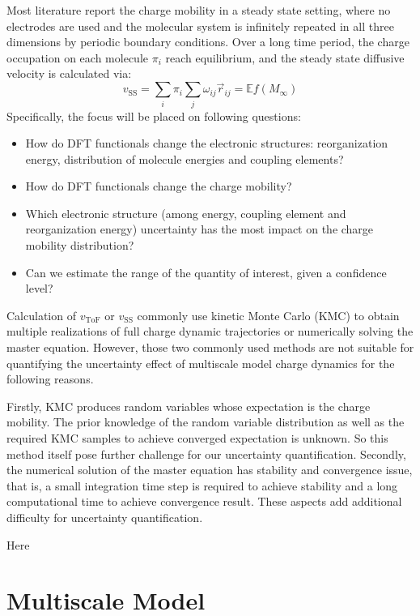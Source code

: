 \documentclass[letterpaper,12pt]{article}
\begin{document}
Most literature report the charge mobility in a steady state setting, where no electrodes are used and the molecular system is infinitely repeated in all three dimensions by periodic boundary conditions. 
Over a long time period, the charge occupation on each molecule $\pi_i$ reach equilibrium, and the steady state diffusive velocity is calculated via:
\begin{equation}
    v_\text{SS} = \sum_i \pi_i \sum_j \omega_{ij} \vec{r}_{ij} = \mathbb{E}f(M_{\infty})
\end{equation} 
Specifically, the focus will be placed on following questions: 
\begin{itemize}
    \item How do DFT functionals change the electronic structures: reorganization energy, distribution of molecule energies and coupling elements? 
    \item How do DFT functionals change the charge mobility?
    \item Which electronic structure (among energy, coupling element and reorganization energy) uncertainty has the most impact on the charge mobility distribution?
    \item Can we estimate the range of the quantity of interest, given a confidence level?
\end{itemize}


Calculation of $v_\text{ToF}$ or $v_\text{SS}$ commonly use kinetic Monte Carlo (KMC) to obtain multiple realizations of full charge dynamic trajectories 
or numerically solving the master equation. 
However, those two commonly used methods are not suitable for quantifying the uncertainty effect of multiscale model charge dynamics for the following reasons. 

Firstly, KMC produces random variables whose expectation is the charge mobility. The prior knowledge of the random variable distribution as well as the required KMC samples to achieve converged expectation is unknown. So this method itself pose further challenge for our uncertainty quantification. 
Secondly, the numerical solution of the master equation has stability and convergence issue, that is, a small integration time step is required to achieve stability and a long computational time to achieve convergence result. These aspects add additional difficulty for uncertainty quantification. 

{\huge Here}

\section{Multiscale Model}
\label{sec:MSM}
\end{document}

